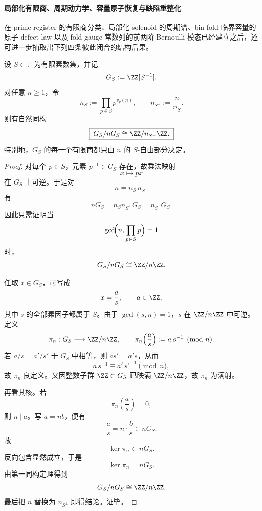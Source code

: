 \paragraph{局部化有限商、周期动力学、容量原子恢复与缺陷重整化}
在 prime-register 的有限商分类、局部化 solenoid 的周期谱、bin-fold 临界容量的原子 defect law 以及 fold-gauge 常数列的前两阶 Bernoulli 模态已经建立之后，还可进一步抽取出下列四条彼此闭合的结构后果。

\begin{theorem}[局部化数系有限商的精确外部化公式]\label{thm:xi-localized-quotient-exact-sfree-externalization}
设 \(S\subset\mathbb P\) 为有限素数集，并记
\[
G_S:=\ZZ[S^{-1}].
\]
对任意 \(n\ge 1\)，令
\[
n_S:=\prod_{p\in S}p^{v_p(n)},
\qquad
n_{S^\perp}:=\frac{n}{n_S}.
\]
则有自然同构
\[
\boxed{\;
G_S/nG_S\cong \ZZ/n_{S^\perp}\ZZ.\;}
\]
特别地，\(G_S\) 的每一个有限商都只由 \(n\) 的 \(S\)-自由部分决定。
\end{theorem}
\begin{proof}
对每个 \(p\in S\)，元素 \(p^{-1}\in G_S\) 存在，故乘法映射
\[
x\longmapsto px
\]
在 \(G_S\) 上可逆。于是对
\[
n=n_S\,n_{S^\perp}
\]
有
\[
nG_S=n_Sn_{S^\perp}G_S=n_{S^\perp}G_S.
\]
因此只需证明当
\[
\gcd\!\Bigl(n,\prod_{p\in S}p\Bigr)=1
\]
时，
\[
G_S/nG_S\cong \ZZ/n\ZZ.
\]

任取 \(x\in G_S\)，可写成
\[
x=\frac{a}{s},
\qquad
a\in\ZZ,
\]
其中 \(s\) 的全部素因子都属于 \(S\)。由于 \(\gcd(s,n)=1\)，\(s\) 在 \(\ZZ/n\ZZ\) 中可逆。定义
\[
\pi_n:G_S\longrightarrow \ZZ/n\ZZ,
\qquad
\pi_n\!\left(\frac{a}{s}\right):=a\,s^{-1}\pmod n.
\]
若 \(a/s=a'/s'\) 于 \(G_S\) 中相等，则 \(as'=a's\)，从而
\[
a\,s^{-1}\equiv a'\,s'^{-1}\pmod n,
\]
故 \(\pi_n\) 良定义。又因整数子群 \(\ZZ\subset G_S\) 已映满 \(\ZZ/n\ZZ\)，故 \(\pi_n\) 为满射。

再看其核。若
\[
\pi_n\!\left(\frac{a}{s}\right)=0,
\]
则 \(n\mid a\)。写 \(a=nb\)，便有
\[
\frac{a}{s}=n\cdot \frac{b}{s}\in nG_S.
\]
故
\[
\ker\pi_n\subset nG_S.
\]
反向包含显然成立，于是
\[
\ker\pi_n=nG_S.
\]
由第一同构定理得到
\[
G_S/nG_S\cong \ZZ/n\ZZ.
\]
最后把 \(n\) 替换为 \(n_{S^\perp}\) 即得结论。证毕。
\end{proof}


